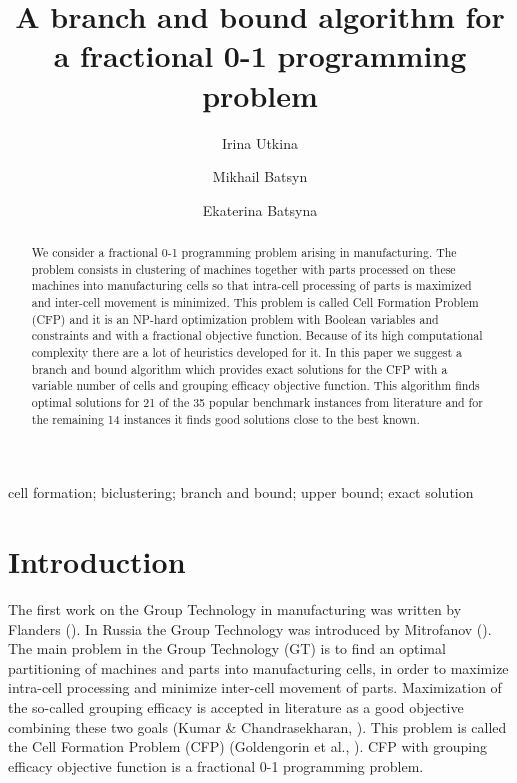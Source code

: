\documentclass[citeauthoryear]{llncs}
\begin{document}
\title{A branch and bound algorithm for a fractional 0-1 programming problem}

\author{Irina Utkina \and Mikhail Batsyn\inst{*} \and Ekaterina Batsyna}

\maketitle

\begin{abstract}
We consider a fractional 0-1 programming problem arising in manufacturing.
The problem consists in clustering of machines together with parts processed on these machines into manufacturing cells so that intra-cell processing of parts is maximized and inter-cell movement is minimized.
This problem is called Cell Formation Problem (CFP) and it is an NP-hard optimization problem with Boolean variables and constraints and with a fractional objective function. Because of its high computational complexity there are a lot of heuristics developed for it. In this paper we suggest a branch and bound algorithm which provides exact solutions for the CFP with a variable number of cells and grouping efficacy objective function. This algorithm finds optimal solutions for 21 of the 35 popular benchmark instances from literature and for the remaining 14 instances it finds good solutions close to the best known.
\end{abstract}

\begin{keywords}
cell formation; biclustering; branch and bound; upper bound; exact solution
\end{keywords}

\section{Introduction}
The first work on the Group Technology in manufacturing was written by Flanders (\cite{Flanders}). In Russia the Group Technology was introduced by Mitrofanov (\cite{Mitrofanov}). The main problem in the Group Technology (GT) is to find an optimal partitioning of machines and parts into manufacturing cells, in order to maximize intra-cell processing and minimize inter-cell movement of parts. Maximization of the so-called grouping efficacy is accepted in literature as a good objective combining these two goals (Kumar \& Chandrasekharan, \cite{3}). This problem is called the Cell Formation Problem (CFP) (Goldengorin et al., \cite{Goldengorin}). CFP with grouping efficacy objective function is a fractional 0-1 programming problem.
\end{document}
